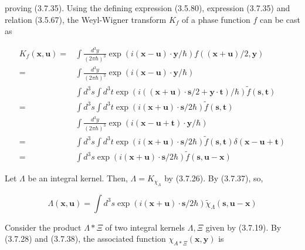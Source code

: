\documentclass{article}
\begin{document}
proving (3.7.35).
Using the defining expression (3.5.80), expression (3.7.35) and relation (3.5.67), the Weyl-Wigner transform $K_{f}$ of a phase function $f$ can be cast as
 
\begin{align*}
K_{f}(\boldsymbol{x}, \boldsymbol{u})= & \int \frac{d^{3} y}{(2 \pi \hbar)^{3}} \exp (i(\boldsymbol{x}-\boldsymbol{u}) \cdot \boldsymbol{y} / \hbar) f((\boldsymbol{x}+\boldsymbol{u}) / 2, \boldsymbol{y})  \tag{3.7.37}\\
= & \int \frac{d^{3} y}{(2 \pi \hbar)^{3}} \exp (i(\boldsymbol{x}-\boldsymbol{u}) \cdot \boldsymbol{y} / \hbar) \\
& \int d^{3} s \int d^{3} t \exp (i((\boldsymbol{x}+\boldsymbol{u}) \cdot \boldsymbol{s} / 2+\boldsymbol{y} \cdot \boldsymbol{t}) / \hbar) \tilde{f}(\boldsymbol{s}, \boldsymbol{t}) \\
= & \int d^{3} s \int d^{3} t \exp (i(\boldsymbol{x}+\boldsymbol{u}) \cdot \boldsymbol{s} / 2 \hbar) \tilde{f}(\boldsymbol{s}, \boldsymbol{t}) \\
& \int \frac{d^{3} y}{(2 \pi \hbar)^{3}} \exp (i(\boldsymbol{x}-\boldsymbol{u}+\boldsymbol{t}) \cdot \boldsymbol{y} / \hbar) \\
= & \int d^{3} s \int d^{3} t \exp (i(\boldsymbol{x}+\boldsymbol{u}) \cdot \boldsymbol{s} / 2 \hbar) \tilde{f}(\boldsymbol{s}, \boldsymbol{t}) \delta(\boldsymbol{x}-\boldsymbol{u}+\boldsymbol{t}) \\
= & \int d^{3} s \exp (i(\boldsymbol{x}+\boldsymbol{u}) \cdot \boldsymbol{s} / 2 \hbar) \tilde{f}(\boldsymbol{s}, \boldsymbol{u}-\boldsymbol{x})
\end{align*}
 

Let $\Lambda$ be an integral kernel. Then, $\Lambda=K_{\chi_{A}}$ by (3.7.26). By (3.7.37), so,
 
\begin{equation*}
\Lambda(\boldsymbol{x}, \boldsymbol{u})=\int d^{3} s \exp (i(\boldsymbol{x}+\boldsymbol{u}) \cdot \boldsymbol{s} / 2 \hbar) \tilde{\chi}_{\Lambda}(\boldsymbol{s}, \boldsymbol{u}-\boldsymbol{x}) \tag{3.7.38}
\end{equation*}
 

Consider the product $\Lambda * \Xi$ of two integral kernels $\Lambda, \Xi$ given by (3.7.19). By (3.7.28) and (3.7.38), the associated function $\chi_{A * \Xi}(\boldsymbol{x}, \boldsymbol{y})$ is
 
\end{document}
